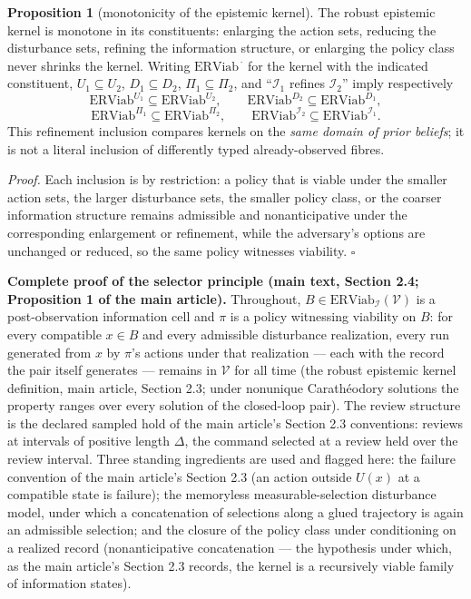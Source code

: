 \documentclass[11pt]{article}
\theoremstyle{definition}
\newtheorem{proposition}{Proposition}
\begin{document}
\begin{proposition}[monotonicity of the epistemic kernel]\label{prop:monotone}
The robust epistemic kernel is monotone in its constituents: enlarging
the action sets, reducing the disturbance sets, refining the information
structure, or enlarging the policy class never shrinks the kernel.
Writing \(\mathrm{ERViab}^{\,\cdot}\) for the kernel with the indicated
constituent, \(U_1\subseteq U_2\), \(D_1\subseteq D_2\),
\(\Pi_1\subseteq\Pi_2\), and ``\(\mathcal{I}_1\) refines
\(\mathcal{I}_2\)'' imply respectively
\[\mathrm{ERViab}^{U_1} \subseteq \mathrm{ERViab}^{U_2}, \qquad
\mathrm{ERViab}^{D_2} \subseteq \mathrm{ERViab}^{D_1},\]
\[\mathrm{ERViab}^{\Pi_1} \subseteq \mathrm{ERViab}^{\Pi_2}, \qquad
\mathrm{ERViab}^{\mathcal{I}_2} \subseteq \mathrm{ERViab}^{\mathcal{I}_1}.\]
This refinement inclusion compares kernels on the \emph{same domain of prior beliefs}; it is not a literal inclusion of differently typed already-observed fibres.
\end{proposition}

\emph{Proof.} Each inclusion is by restriction: a policy that is viable
under the smaller action sets, the larger disturbance sets, the smaller
policy class, or the coarser information structure remains admissible
and nonanticipative under the corresponding enlargement or refinement,
while the adversary's options are unchanged or reduced, so the same
policy witnesses viability. \ensuremath{\square}

\noindent\textbf{Complete proof of the selector principle (main text, Section 2.4; Proposition 1 of the main article).}
Throughout, \(B \in \mathrm{ERViab}_{\mathcal{I}}(\mathcal{V})\) is a
post-observation information cell and \(\pi\) is a policy witnessing
viability on \(B\): for every compatible \(x \in B\) and every
admissible disturbance realization, every run generated from \(x\) by
\(\pi\)'s actions under that realization --- each with the record the
pair itself generates --- remains in \(\mathcal{V}\) for all time (the
robust epistemic kernel definition, main article, Section 2.3; under
nonunique Carath\'eodory solutions the property ranges over every
solution of the closed-loop pair). The review structure is the declared
sampled hold of the main article's Section 2.3 conventions: reviews at
intervals of positive length \(\Delta\), the command selected at a
review held over the review interval. Three standing ingredients are
used and flagged here: the failure convention of the main article's
Section 2.3 (an action outside \(U(x)\) at a compatible state is
failure); the memoryless measurable-selection disturbance model, under
which a concatenation of selections along a glued trajectory is again
an admissible selection; and the closure of the policy class under
conditioning on a realized record (nonanticipative concatenation --- the
hypothesis under which, as the main article's Section 2.3 records, the
kernel is a recursively viable family of information states).
\end{document}
